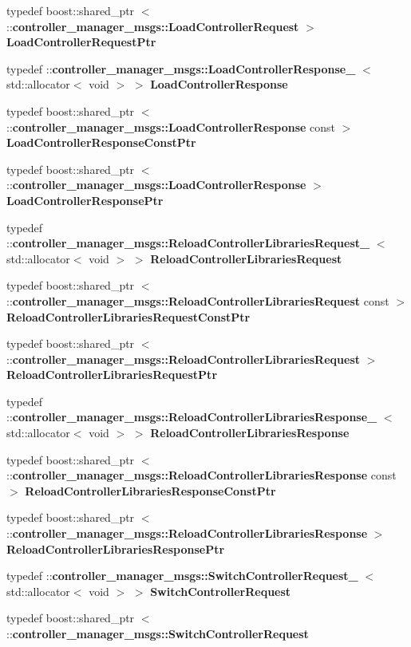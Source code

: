 \begin{DoxyCompactItemize}
typedef boost\-::shared\-\_\-ptr\*
$<$ \-::{\bf controller\-\_\-manager\-\_\-msgs\-::\-Load\-Controller\-Request} $>$ {\bf \-Load\-Controller\-Request\-Ptr}
\item 
typedef \*
\-::{\bf controller\-\_\-manager\-\_\-msgs\-::\-Load\-Controller\-Response\-\_\-}\*
$<$ std\-::allocator$<$ void $>$ $>$ {\bf \-Load\-Controller\-Response}
\item 
typedef boost\-::shared\-\_\-ptr\*
$<$ \-::{\bf controller\-\_\-manager\-\_\-msgs\-::\-Load\-Controller\-Response} \*
const  $>$ {\bf \-Load\-Controller\-Response\-Const\-Ptr}
\item 
typedef boost\-::shared\-\_\-ptr\*
$<$ \-::{\bf controller\-\_\-manager\-\_\-msgs\-::\-Load\-Controller\-Response} $>$ {\bf \-Load\-Controller\-Response\-Ptr}
\item 
typedef \*
\-::{\bf controller\-\_\-manager\-\_\-msgs\-::\-Reload\-Controller\-Libraries\-Request\-\_\-}\*
$<$ std\-::allocator$<$ void $>$ $>$ {\bf \-Reload\-Controller\-Libraries\-Request}
\item 
typedef boost\-::shared\-\_\-ptr\*
$<$ \-::{\bf controller\-\_\-manager\-\_\-msgs\-::\-Reload\-Controller\-Libraries\-Request} \*
const  $>$ {\bf \-Reload\-Controller\-Libraries\-Request\-Const\-Ptr}
\item 
typedef boost\-::shared\-\_\-ptr\*
$<$ \-::{\bf controller\-\_\-manager\-\_\-msgs\-::\-Reload\-Controller\-Libraries\-Request} $>$ {\bf \-Reload\-Controller\-Libraries\-Request\-Ptr}
\item 
typedef \*
\-::{\bf controller\-\_\-manager\-\_\-msgs\-::\-Reload\-Controller\-Libraries\-Response\-\_\-}\*
$<$ std\-::allocator$<$ void $>$ $>$ {\bf \-Reload\-Controller\-Libraries\-Response}
\item 
typedef boost\-::shared\-\_\-ptr\*
$<$ \-::{\bf controller\-\_\-manager\-\_\-msgs\-::\-Reload\-Controller\-Libraries\-Response} \*
const  $>$ {\bf \-Reload\-Controller\-Libraries\-Response\-Const\-Ptr}
\item 
typedef boost\-::shared\-\_\-ptr\*
$<$ \-::{\bf controller\-\_\-manager\-\_\-msgs\-::\-Reload\-Controller\-Libraries\-Response} $>$ {\bf \-Reload\-Controller\-Libraries\-Response\-Ptr}
\item 
typedef \*
\-::{\bf controller\-\_\-manager\-\_\-msgs\-::\-Switch\-Controller\-Request\-\_\-}\*
$<$ std\-::allocator$<$ void $>$ $>$ {\bf \-Switch\-Controller\-Request}
\item 
typedef boost\-::shared\-\_\-ptr\*
$<$ \-::{\bf controller\-\_\-manager\-\_\-msgs\-::\-Switch\-Controller\-Request} \*

\end{DoxyCompactItemize}
